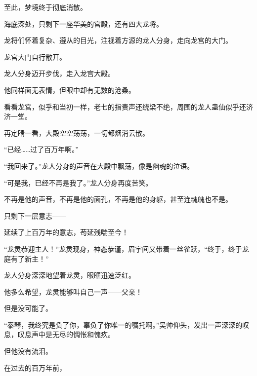 \begin{this_body}
至此，梦境终于彻底消散。

海底深处，只剩下一座华美的宫殿，还有四大龙将。

龙将们怀着复杂、遵从的目光，注视着方源的龙人分身，走向龙宫的大门。

龙宫大门自行敞开。

龙人分身迈开步伐，走入龙宫大殿。

他同样面无表情，但眼中却有无数的沧桑。

看看龙宫，似乎和当初一样，老七的指责声还绕梁不绝，周围的龙人蛊仙似乎还济济一堂。

再定睛一看，大殿空空荡荡，一切都烟消云散。

“已经……过了百万年啊。”

“我回来了。”龙人分身的声音在大殿中飘荡，像是幽魂的泣语。

“可是我，已经不再是我了。”龙人分身再度苦笑。

不再是他的声音，不再是他的面孔，不再是他的身躯，甚至连魂魄也不是。

只剩下一层意志——

延续了上百万年的意志，苟延残喘至今！

“龙灵恭迎主人！”龙灵现身，神态恭谨，眉宇间又带着一丝雀跃，“终于，终于龙庭有了新主！”

龙人分身深深地望着龙灵，眼眶迅速泛红。

他多么希望，龙灵能够叫自己一声——父亲！

但是没可能了。

“泰琴，我终究是负了你，辜负了你唯一的嘱托啊。”吴帅仰头，发出一声深深的叹息，叹息声中是无尽的惆怅和愧疚。

但他没有流泪。

在过去的百万年前，

\end{this_body}

